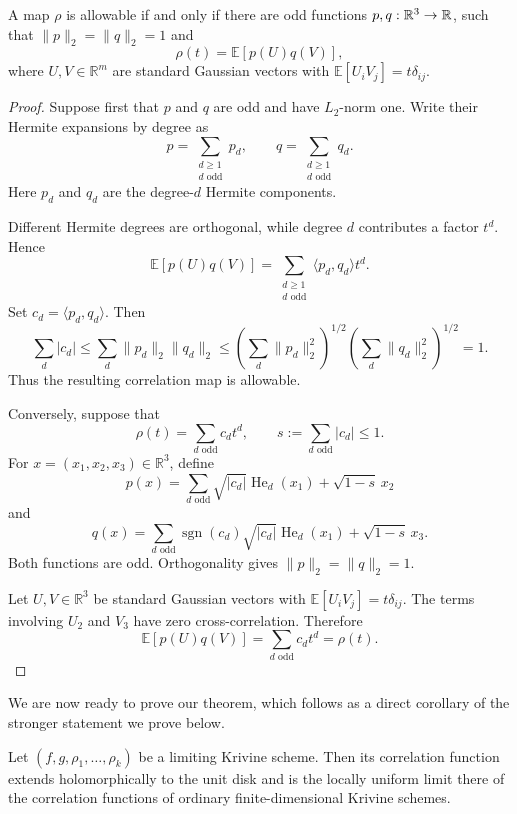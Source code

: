 \begin{lemma}
A map \(\rho\) is allowable if and only if there are odd functions
\(p,q: \mathbb{R}^3 \to \mathbb{R}\), such that
\(\|p\|_2=\|q\|_2=1\) and
\[
\rho(t)=\mathbb{E}[p(U)q(V)],
\]
where \(U,V\in\mathbb{R}^m\) are standard Gaussian vectors with
\(\mathbb{E}[U_iV_j]=t\delta_{ij}\).
\end{lemma}

\begin{proof}
Suppose first that \(p\) and \(q\) are odd and have \(L_2\)-norm one. Write
their Hermite expansions by degree as
\[
p=\sum_{\substack{d\geq 1\\ d\text{ odd}}}p_d,
\qquad
q=\sum_{\substack{d\geq 1\\ d\text{ odd}}}q_d.
\]
Here \(p_d\) and \(q_d\) are the degree-\(d\) Hermite components.

Different Hermite degrees are orthogonal, while degree \(d\) contributes a
factor \(t^d\). Hence
\[
\mathbb{E}[p(U)q(V)]
=
\sum_{\substack{d\geq 1\\ d\text{ odd}}}
\langle p_d,q_d\rangle t^d.
\]
Set \(c_d=\langle p_d,q_d\rangle\). Then
\[
\sum_d|c_d|
\leq
\sum_d\|p_d\|_2\|q_d\|_2
\leq
\left(\sum_d\|p_d\|_2^2\right)^{1/2}
\left(\sum_d\|q_d\|_2^2\right)^{1/2}
=
1.
\]
Thus the resulting correlation map is allowable.

Conversely, suppose that
\[
\rho(t)=\sum_{d\text{ odd}}c_dt^d,
\qquad
s:=\sum_{d\text{ odd}}|c_d|\leq 1.
\]
For \(x=(x_1,x_2,x_3)\in\mathbb{R}^3\), define
\[
p(x)
=
\sum_{d\text{ odd}}
\sqrt{|c_d|}\operatorname{He}_d(x_1)
+
\sqrt{1-s}\,x_2
\]
and
\[
q(x)
=
\sum_{d\text{ odd}}
\operatorname{sgn}(c_d)\sqrt{|c_d|}
\operatorname{He}_d(x_1)
+
\sqrt{1-s}\,x_3.
\]
Both functions are odd. Orthogonality gives \(\|p\|_2=\|q\|_2=1\).

Let \(U,V\in\mathbb{R}^3\) be standard Gaussian vectors with
\(\mathbb{E}[U_iV_j]=t\delta_{ij}\). The terms involving \(U_2\) and \(V_3\)
have zero cross-correlation. Therefore
\[
\mathbb{E}[p(U)q(V)]
=
\sum_{d\text{ odd}}c_dt^d
=
\rho(t).
\]
\end{proof}

We are now ready to prove our theorem, which follows as a direct corollary of the stronger statement we prove below. 

\begin{theorem}
Let \((f,g,\rho_1,\ldots,\rho_k)\) be a limiting Krivine scheme.
Then its correlation function extends holomorphically to the unit disk and is
the locally uniform limit there of the correlation functions of ordinary
finite-dimensional Krivine schemes.
\end{theorem}

